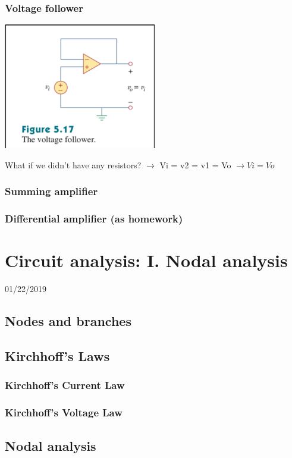 \documentclass[11pt]{book}
\begin{document}
\subsection{Voltage follower}
\includegraphics[width=0.5\textwidth]{figures/op-amp5.png}

What if we didn’t have any resistors? $\rightarrow$ Vi = v2 = v1 = Vo $\rightarrow Vi = Vo$


\subsection{Summing amplifier}
\subsection{Differential amplifier (as homework)}



\chapter{Circuit analysis: I. Nodal analysis}
01/22/2019
\section{Nodes and branches}
\section{Kirchhoff's Laws}
\subsection{Kirchhoff's Current Law}
\subsection{Kirchhoff's Voltage Law}
\section{Nodal analysis}
\end{document}
